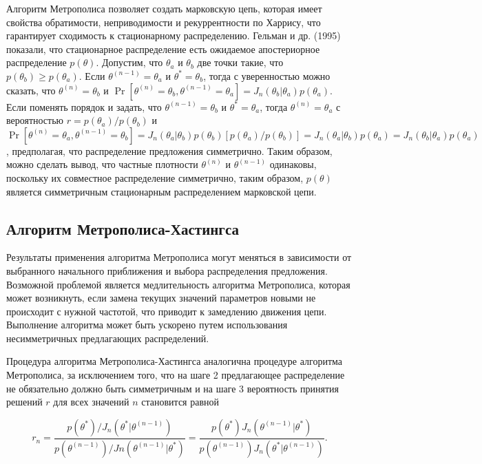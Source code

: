 Алгоритм Метрополиса позволяет создать марковскую цепь, которая имеет свойства обратимости, неприводимости и рекуррентности по Харрису, что гарантирует сходимость к стационарному распределению. Гельман и др. (1995) показали, что стационарное распределение есть ожидаемое апостериорное распределение $p(\theta)$. Допустим, что $\theta_a$ и $\theta_b$ две точки такие, что $p(\theta_b){\geq}p(\theta_a)$. Если $\theta^{(n-1)}=\theta_a$ и $\theta^{*}=\theta_b$, тогда с уверенностью можно сказать, что $\theta^{(n)}=\theta_b$ и $\Pr[\theta^{(n)}=\theta_b,\theta^{(n-1)}=\theta_a]=J_{n}(\theta_b|\theta_a)p(\theta_a)$. Если поменять порядок и задать, что $\theta^{(n-1)}=\theta_b$ и $\theta^*=\theta_a$, тогда $\theta^{(n)}=\theta_a$ с вероятностью $r=p(\theta_a)/p(\theta_b)$ и $\Pr[\theta^{(n)}=\theta_{a}, \theta^{(n-1)}=\theta_b]=J_{n}(\theta_a|\theta_b)p(\theta_b)[p(\theta_a)/p(\theta_b)]=J_{n}(\theta_a|\theta_b)p(\theta_a)=J_{n}(\theta_b|\theta_a)p(\theta_a)$, предполагая, что распределение предложения симметрично. Таким образом, можно сделать вывод, что частные плотности  $\theta^{(n)}$ и $\theta^{(n-1)}$ одинаковы, поскольку их совместное распределение симметрично, таким образом,  $p(\theta)$ является симметричным стационарным распределением марковской цепи.



\subsection{Алгоритм Метрополиса-Хастингса}

Результаты применения алгоритма Метрополиса могут меняться в зависимости от выбранного начального приближения  и выбора распределения предложения. Возможной проблемой является медлительность алгоритма Метрополиса, которая может возникнуть, если замена текущих значений параметров новыми не происходит с нужной частотой, что приводит к замедлению движения цепи. Выполнение алгоритма может быть ускорено путем использования несимметричных предлагающих распределений.

Процедура алгоритма Метрополиса-Хастингса аналогична процедуре алгоритма Метрополиса, за исключением того, что на шаге 2 предлагающее распределение не обязательно должно быть симметричным и на шаге 3 вероятность принятия решений $r$ для всех значений $n$ становится равной 

\[
r_n=\dfrac{p(\theta^{*})/J_{n}(\theta^{*}|\theta^{(n-1)})}{p(\theta^{(n-1)})/J{n}(\theta^{(n-1)}|\theta^*)}=\dfrac{p(\theta^*)J_{n}(\theta^{(n-1)}|\theta^*)}{p(\theta^{(n-1)})J_{n}(\theta^*|\theta^{(n-1)})}.
\]

